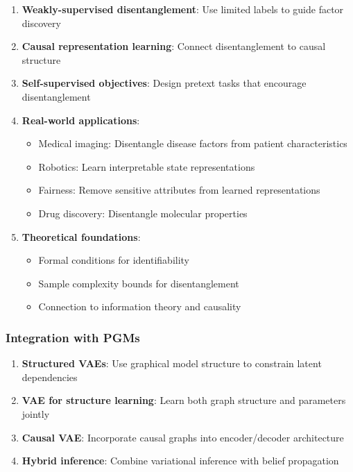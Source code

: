 \documentclass[conference]{IEEEtran}
\begin{document}
\begin{enumerate}
    \item \textbf{Weakly-supervised disentanglement}: Use limited labels to guide factor discovery
    
    \item \textbf{Causal representation learning}: Connect disentanglement to causal structure
    
    \item \textbf{Self-supervised objectives}: Design pretext tasks that encourage disentanglement
    
    \item \textbf{Real-world applications}:
    \begin{itemize}
        \item Medical imaging: Disentangle disease factors from patient characteristics
        \item Robotics: Learn interpretable state representations
        \item Fairness: Remove sensitive attributes from learned representations
        \item Drug discovery: Disentangle molecular properties
    \end{itemize}
    
    \item \textbf{Theoretical foundations}: 
    \begin{itemize}
        \item Formal conditions for identifiability
        \item Sample complexity bounds for disentanglement
        \item Connection to information theory and causality
    \end{itemize}
\end{enumerate}

\subsubsection{Integration with PGMs}

\begin{enumerate}
    \item \textbf{Structured VAEs}: Use graphical model structure to constrain latent dependencies
    
    \item \textbf{VAE for structure learning}: Learn both graph structure and parameters jointly
    
    \item \textbf{Causal VAE}: Incorporate causal graphs into encoder/decoder architecture
    
    \item \textbf{Hybrid inference}: Combine variational inference with belief propagation
\end{enumerate}
\end{document}
